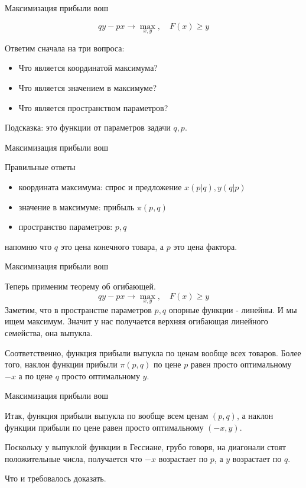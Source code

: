 \documentclass{beamer}
\begin{document}
\begin{frame}{Максимизация прибыли вош}

$$ q y - p x \to \max_{x,y}, \quad F(x) \geqslant y$$

Ответим сначала на три вопроса:

\begin{itemize}
  \item Что является координатой максимума?
  \item Что является значением в максимуме?
  \item Что является пространством параметров?
\end{itemize}

Подсказка: это функции от параметров задачи $q, p$.

\end{frame}

\begin{frame}{Максимизация прибыли вош}

Правильные ответы

\begin{itemize}
  \item координата максимума: спрос и предложение $x(p|q), y(q|p)$
  \item значение в максимуме: прибыль $\pi(p, q)$
  \item пространство параметров: $p, q$
\end{itemize}

напомню что $q$ это цена конечного товара, а $p$ это цена фактора.

\end{frame}

\begin{frame}{Максимизация прибыли вош}

Теперь применим теорему об огибающей.
$$ q y - p x \to \max_{x,y}, \quad F(x) \geqslant y$$
Заметим, что в пространстве параметров $p,q$ опорные функции - линейны. И мы ищем максимум. Значит у нас получается верхняя огибающая линейного семейства, она выпукла. 

Соответственно, функция прибыли выпукла по ценам вообще всех товаров. Более того, наклон функции прибыли $\pi(p, q)$ по цене $p$ равен просто оптимальному $-x$ а по цене $q$ просто оптимальному $y$.
\end{frame}

\begin{frame}{Максимизация прибыли вош}

Итак, функция прибыли выпукла по вообще всем ценам $(p,q)$, а наклон функции прибыли по цене равен просто оптимальному $(-x,y)$.

Поскольку у выпуклой функции в Гессиане, грубо говоря, на диагонали стоят положительные числа, получается что $-x$ возрастает по $p$, а $y$ возрастает по $q$. 

Что и требовалось доказать.

\end{frame}
\end{document}
